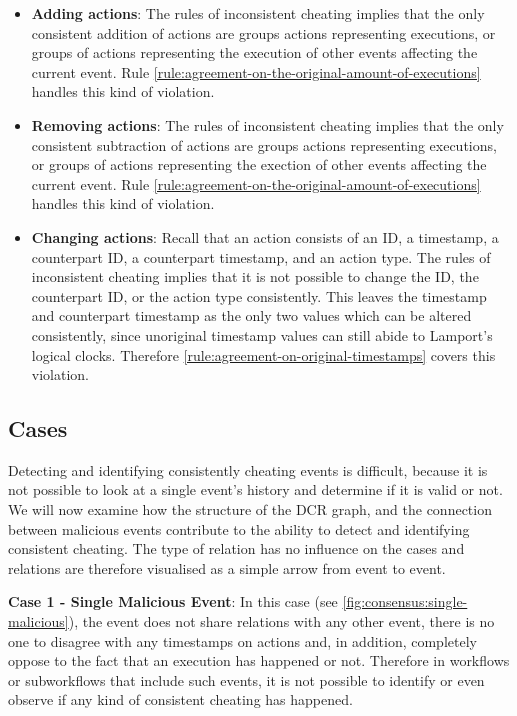 	\begin{itemize}
		\item \textbf{Adding actions}: The rules of inconsistent cheating implies that the only consistent addition of actions are groups actions representing executions, or groups of actions representing the execution of other events affecting the current event. Rule  \ref{rule:agreement-on-the-original-amount-of-executions} handles this kind of violation.
		\item \textbf{Removing actions}: The rules of inconsistent cheating implies that the only consistent subtraction of actions are groups actions representing executions, or groups of actions representing the exection of other events affecting the current event. Rule  \ref{rule:agreement-on-the-original-amount-of-executions} handles this kind of violation.
		\item \textbf{Changing actions}: Recall that an action consists of an ID, a timestamp, a counterpart ID, a counterpart timestamp, and an action type. The rules of inconsistent cheating implies that it is not possible to change the ID, the counterpart ID, or the action type consistently. This leaves the timestamp and counterpart timestamp as the only two values which can be altered consistently, since unoriginal timestamp values can still abide to Lamport's logical clocks. Therefore \autoref{rule:agreement-on-original-timestamps} covers this violation.
	\end{itemize}
	
	\subsection{Cases}
	Detecting and identifying consistently cheating events is difficult, because it is not possible to look at a single event's history and determine if it is valid or not. We will now examine how the structure of the DCR graph, and the connection between malicious events contribute to the ability to detect and identifying consistent cheating. The type of relation has no influence on the cases and relations are therefore visualised as a simple arrow from event to event.
	
	\newpar \textbf{Case 1 - Single Malicious Event}: In this case (see \ref{fig:consensus:single-malicious}), the event does not share relations with any other event, there is no one to disagree with any timestamps on actions and, in addition, completely oppose to the fact that an execution has happened or not. Therefore in workflows or subworkflows that include such events, it is not possible to identify or even observe if any kind of consistent cheating has happened.
	
